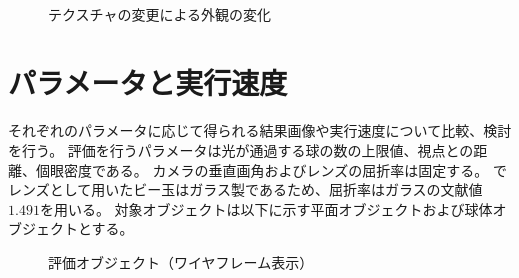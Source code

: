\begin{figure}[htbp]
{\label{FTex3}}
\\
  \caption{テクスチャの変更による外観の変化}
  \label{FTexResults}
\end{figure}




\newpage
\section{パラメータと実行速度}
\label{SParameterAndExeTime}

それぞれのパラメータに応じて得られる結果画像や実行速度について比較、検討を行う。
評価を行うパラメータは光が通過する球の数の上限値、視点との距離、個眼密度である。
カメラの垂直画角およびレンズの屈折率は固定する。
でレンズとして用いたビー玉はガラス製であるため、屈折率はガラスの文献値$1.491$を用いる。
対象オブジェクトは以下に示す平面オブジェクトおよび球体オブジェクトとする。
\begin{figure}[htbp]
  \centering
{}
  \caption{評価オブジェクト（ワイヤフレーム表示）}
  \label{FEvalObject}
\end{figure}

